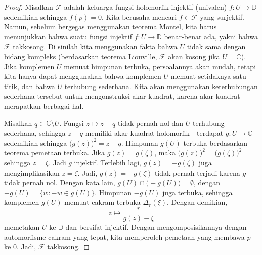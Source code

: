 \documentclass[12pt,openany]{book}
\newcommand{\C}{{\mathbb{C}}}
\newcommand{\D}{{\mathbb{D}}}
\newcommand{\sF}{{\mathscr{F}}}
\theoremstyle{plain}
\theoremstyle{remark}
\theoremstyle{definition}
\theoremstyle{exercise}
\theoremstyle{example}
\begin{document}
\begin{proof}
Misalkan $\sF$ adalah keluarga fungsi holomorfik injektif (univalen)
$f \colon U \to \D$ sedemikian sehingga $f(p) = 0$.  Kita berusaha mencari
$f \in \sF$ yang surjektif.
Namun, sebelum bergegas menggunakan teorema Montel, kita harus menunjukkan bahwa suatu fungsi
injektif
$f \colon U \to \D$ benar-benar ada,
yakni bahwa $\sF$ takkosong.  Di sinilah kita
menggunakan fakta bahwa $U$ tidak sama dengan bidang kompleks (berdasarkan teorema Liouville, $\sF$
akan kosong jika $U = \C$).  Jika komplemen $U$ memuat himpunan
terbuka, persoalannya akan mudah, tetapi kita hanya dapat menggunakan bahwa komplemen $U$
memuat setidaknya satu titik, dan bahwa $U$ terhubung sederhana.  Kita akan menggunakan
keterhubungan sederhana tersebut untuk mengonstruksi akar kuadrat, karena akar kuadrat merapatkan
berbagai hal.

Misalkan $q \in \C \setminus U$.  Fungsi $z \mapsto z-q$ tidak pernah
nol dan $U$ terhubung sederhana, sehingga $z-q$ memiliki akar kuadrat
holomorfik---terdapat $g \colon U \to \C$ sedemikian sehingga
${\bigl(g(z)\bigr)}^2 = z-q$.
Himpunan $g(U)$ terbuka berdasarkan \hyperref[thm:OMT]{teorema pemetaan terbuka}.
Jika $g(z)=g(\zeta)$, maka ${\bigl(g(z)\bigr)}^2={\bigl(g(\zeta)\bigr)}^2$ sehingga
$z=\zeta$.  Jadi $g$ injektif.  Terlebih lagi,
$g(z)=-g(\zeta)$ juga mengimplikasikan $z=\zeta$.  Jadi, $g(z) =
-g(\zeta)$ tidak pernah terjadi karena $g$ tidak pernah nol.
Dengan kata lain, $g(U) \cap \bigl( - g(U) \bigr) = \emptyset$,
dengan
$- g(U) = \{ w : -w \in g(U) \}$.
Himpunan
$- g(U)$ juga terbuka, sehingga
komplemen $g(U)$ memuat cakram terbuka $\Delta_r(\xi)$.  Dengan demikian,
\begin{equation*}
z \mapsto \frac{r}{g(z)-\xi}
\end{equation*}
memetakan $U$ ke $\D$ dan bersifat injektif.
Dengan mengomposisikannya dengan automorfisme cakram yang tepat,
kita memperoleh pemetaan yang membawa $p$ ke $0$.  Jadi, $\sF$ takkosong.


\end{proof}
\end{document}
